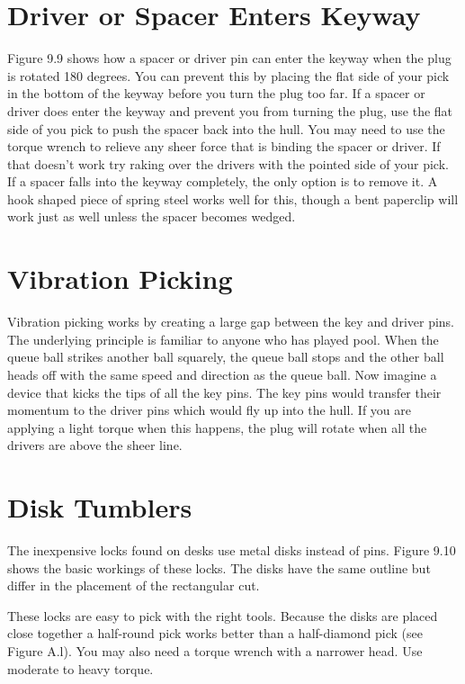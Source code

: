\section{Driver or Spacer Enters Keyway}
Figure 9.9 shows how a spacer or driver pin can enter the keyway when the plug is rotated 
180 degrees. You can prevent this by placing the flat side of your pick in the bottom of the 
keyway before you turn the plug too far. If a spacer or driver does enter the keyway and 
prevent you from turning the plug, use the flat side of you pick to push the spacer back into
the hull. You may need to use the torque wrench to relieve any sheer force that is binding 
the spacer or driver. If that doesn't work try raking over the drivers with the pointed side 
of your pick. If a spacer falls into the keyway completely, the only option is to remove it. A 
hook shaped piece of spring steel works well for this, though a bent paperclip will work just 
as well unless the spacer becomes wedged. 

\section{Vibration Picking}
Vibration picking works by creating a large gap between the key and driver pins. The 
underlying principle is familiar to anyone who has played pool. When the queue ball strikes 
another ball squarely, the queue ball stops and the other ball heads off with the same speed 
and direction as the queue ball. Now imagine a device that kicks the tips of all the key pins. 
The key pins would transfer their momentum to the driver pins which would fly up into the 
hull. If you are applying a light torque when this happens, the plug will rotate when all the 
drivers are above the sheer line.

\section{Disk Tumblers}
The inexpensive locks found on desks use metal disks instead of pins. Figure 9.10 shows the 
basic workings of these locks. The disks have the same outline but differ in the placement 
of the rectangular cut. 

These locks are easy to pick with the right tools. Because the disks are placed close 
together a half-round pick works better than a half-diamond pick (see Figure A.l). You may 
also need a torque wrench with a narrower head. Use moderate to heavy torque.
